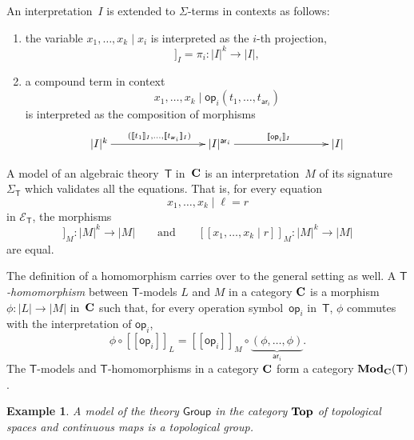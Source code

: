 \documentclass{amsart}
\newcommand{\theory}[1]{\mathsf{#1}} %
\newcommand{\signature}[1]{\Sigma_{\theory{#1}}} %
\newcommand{\equations}[1]{\mathcal{E}_{\theory{#1}}} %
\newcommand{\ModC}[2]{\text{\textbf{Mod}}_{#1}(\theory{#2})} %
\newcommand{\category}[1]{\text{\textbf{#1}}} %
\newcommand{\carrier}[1]{|#1|} %
\newcommand{\op}[1]{\mathsf{op}_{#1}} %
\newcommand{\arity}[1]{\mathsf{ar}_{#1}} %
\newcommand{\sem}[1]{[\![#1]\!]} %
\newtheorem{example}[definition]{Example}
\begin{document}
An interpretation~$I$ is extended to $\Sigma$-terms in contexts as follows:
%
\begin{enumerate}
\item the variable $x_1, \ldots, x_k \mid x_i$ is interpreted as the $i$-th projection,
  \begin{equation*}
    \sem{x_1, \ldots, x_k \mid  x_i}_I = \pi_i : \carrier{I}^k \to \carrier{I},
  \end{equation*}
\item a compound term in context
  \begin{equation*}
    x_1, \ldots, x_k \mid \op{i}(t_1, \ldots, t_{\arity{i}})
  \end{equation*}
  is interpreted as the composition of morphisms
  \begin{equation*}
    \xymatrix@+6em{
      {\carrier{I}^k} \ar[r]^{(\sem{t_1}_I, \ldots, \sem{t_{\arity{i}}}_I)}
      &
      {\carrier{I}^{\arity{i}}} \ar[r]^{\sem{\op{i}}_I}
      &
      {\carrier{I}}
    }
  \end{equation*}
\end{enumerate}
%
A model of an algebraic theory~$\theory{T}$ in~$\category{C}$ is an interpretation~$M$ of
its signature $\signature{T}$ which validates all the equations. That is, for every
equation
%
\begin{equation*}
  x_1, \ldots, x_k \mid \ell = r
\end{equation*}
%
in $\equations{T}$, the morphisms
%
\begin{equation*}
  \sem{x_1, \ldots, x_k \mid \ell}_M : \carrier{M}^k \to \carrier{M}
  \qquad\text{and}\qquad
  \sem{x_1, \ldots, x_k \mid r}_M : \carrier{M}^k \to \carrier{M}
\end{equation*}
%
are equal.

The definition of a homomorphism carries over to the general setting as well. A
\emph{$\theory{T}$-homomorphism} between $\theory{T}$-models $L$ and $M$ in a category
$\category{C}$ is a morphism $\phi : \carrier{L} \to \carrier{M}$ in~$\category{C}$ such that, for every
operation symbol~$\op{i}$ in~$\theory{T}$, $\phi$ commutes with the interpretation of
$\op{i}$,
%
\begin{equation*}
  \phi \circ \sem{\op{i}}_L = \sem{\op{i}}_M \circ \underbrace{(\phi, \ldots, \phi)}_{\arity{i}}.
\end{equation*}
%
The $\theory{T}$-models and $\theory{T}$-homomorphisms in a category $\category{C}$ form a
category $\ModC{\category{C}}{T}$.

\begin{example}
  A model of the theory $\theory{Group}$ in the category $\category{Top}$ of
  topological spaces and continuous maps is a topological group.
\end{example}
\end{document}
